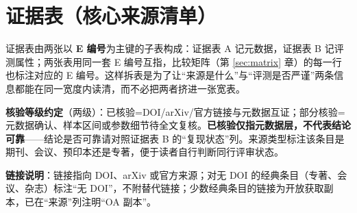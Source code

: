 \section{证据表（核心来源清单）}\label{sec:evidence}

证据表由两张以 \textbf{E 编号}为主键的子表构成：证据表 A 记元数据，证据表 B 记评测属性；两张表用同一套 E 编号互指，比较矩阵（第 \ref{sec:matrix} 章）的每一行也标注对应的 E 编号。这样拆表是为了让“来源是什么”与“评测是否严谨”两条信息都能在同一宽度内读清，而不必把两者挤进一张宽表。

\textbf{核验等级约定}（两级）：\textsc{已核验}=DOI/arXiv/官方链接与元数据互证；\textsc{部分核验}=元数据确认、样本区间或参数细节待全文复核。\textbf{\textsc{已核验}仅指元数据层，不代表结论可靠}——结论是否可靠请对照证据表 B 的“复现状态”列。来源类型标注该条目是期刊、会议、预印本还是专著，便于读者自行判断同行评审状态。

\textbf{链接说明}：链接指向 DOI、arXiv 或官方来源；对无 DOI 的经典条目（专著、会议、杂志）标注“无 DOI”，不附替代链接；少数经典条目的链接为开放获取副本，已在“来源”列注明“OA 副本”。

